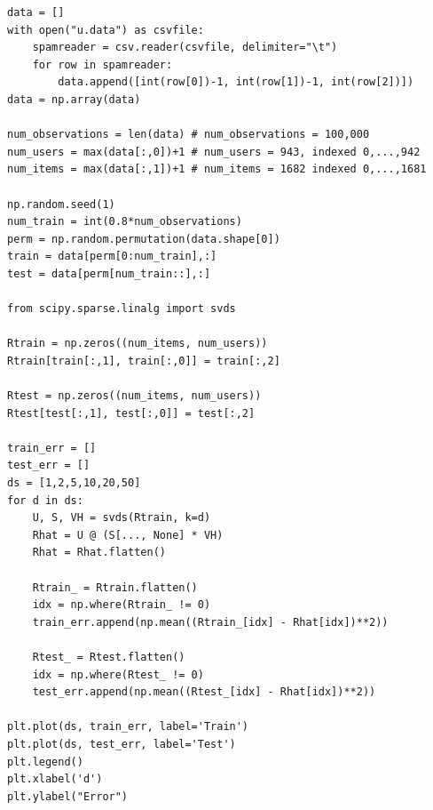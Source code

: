 \documentclass{article}
\begin{document}
\begin{enumerate}
\begin{verbatim}
data = []
with open("u.data") as csvfile:
    spamreader = csv.reader(csvfile, delimiter="\t")
    for row in spamreader:
        data.append([int(row[0])-1, int(row[1])-1, int(row[2])])
data = np.array(data)

num_observations = len(data) # num_observations = 100,000
num_users = max(data[:,0])+1 # num_users = 943, indexed 0,...,942
num_items = max(data[:,1])+1 # num_items = 1682 indexed 0,...,1681

np.random.seed(1)
num_train = int(0.8*num_observations)
perm = np.random.permutation(data.shape[0])
train = data[perm[0:num_train],:]
test = data[perm[num_train::],:]

from scipy.sparse.linalg import svds

Rtrain = np.zeros((num_items, num_users))
Rtrain[train[:,1], train[:,0]] = train[:,2]

Rtest = np.zeros((num_items, num_users))
Rtest[test[:,1], test[:,0]] = test[:,2]

train_err = []
test_err = []
ds = [1,2,5,10,20,50]
for d in ds:
    U, S, VH = svds(Rtrain, k=d)
    Rhat = U @ (S[..., None] * VH)
    Rhat = Rhat.flatten()
    
    Rtrain_ = Rtrain.flatten()
    idx = np.where(Rtrain_ != 0)
    train_err.append(np.mean((Rtrain_[idx] - Rhat[idx])**2))

    Rtest_ = Rtest.flatten()
    idx = np.where(Rtest_ != 0)
    test_err.append(np.mean((Rtest_[idx] - Rhat[idx])**2))

plt.plot(ds, train_err, label='Train')
plt.plot(ds, test_err, label='Test')
plt.legend()
plt.xlabel('d')
plt.ylabel("Error") 
        \end{verbatim}


\end{enumerate}
\end{document}
